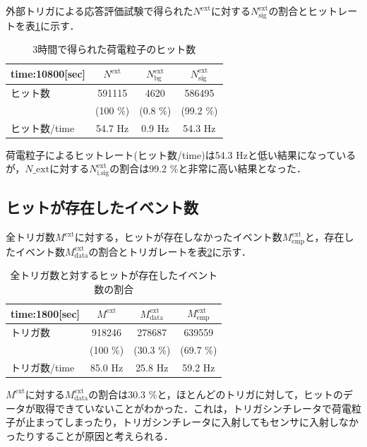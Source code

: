 外部トリガによる応答評価試験で得られた$N^{\mathrm{ext}}$に対する$N_{\mathrm{sig}}^{\mathrm{ext}}$の割合とヒットレートを表\ref{tab:extp}に示す．
\begin{table}[h]
  \centering
  \caption{3時間で得られた荷電粒子のヒット数}
  \begin{tabular} {l|ccc} \hline
    time:10800[sec]& $N^{\mathrm{ext}}$ & $N_{\mathrm{bg}}^{\mathrm{ext}}$ & $N_{\mathrm{sig}}^{\mathrm{ext}}$ \\ \hline \hline
    ヒット数 & 591115 & 4620 & 586495 \\
    & (100 \%) & (0.8 \%) & (99.2 \%) \\ \hline
    ヒット数/time & 54.7 $\mathrm{Hz}$ & 0.9 $\mathrm{Hz}$ & 54.3 $\mathrm{Hz}$ \\ \hline
  \end{tabular}
  \label{tab:extp}
\end{table}

荷電粒子によるヒットレート(ヒット数/time)は54.3 $\mathrm{Hz}$と低い結果になっているが，$N\_{\mathrm{ext}}$に対する$N_{\mathrm{i.sig}}^{\mathrm{ext}}$の割合は99.2 \%と非常に高い結果となった．

\subsection*{ヒットが存在したイベント数}
全トリガ数$M^{\mathrm{ext}}$に対する，ヒットが存在しなかったイベント数$M_{\mathrm{emp}}^{\mathrm{ext}}$と，存在したイベント数$M_{\mathrm{data}}^{\mathrm{ext}}$の割合とトリガレートを表\ref{tab:extr}に示す．

\begin{table}[h]
  \centering
  \caption{全トリガ数と対するヒットが存在したイベント数の割合}
  \begin{tabular} {l|ccc} \hline
    time:1800[sec] & $M^{\mathrm{ext}}$ & $M_{\mathrm{data}}^{\mathrm{ext}}$ & $M_{\mathrm{emp}}^{\mathrm{ext}}$ \\ \hline \hline
    トリガ数 & 918246 & 278687 & 639559 \\
     & (100 \%) & (30.3 \%) & (69.7 \%) \\ \hline
    トリガ数/time & 85.0 $\mathrm{Hz}$ & 25.8 $\mathrm{Hz}$ & 59.2 $\mathrm{Hz}$ \\ \hline
  \end{tabular}
  \label{tab:extr}
\end{table}

$M^{\mathrm{ext}}$に対する$M_{\mathrm{data}}^{\mathrm{ext}}$の割合は30.3 \%と，ほとんどのトリガに対して，ヒットのデータが取得できていないことがわかった．これは，トリガシンチレータで荷電粒子が止まってしまったり，トリガシンチレータに入射してもセンサに入射しなかったりすることが原因と考えられる．

